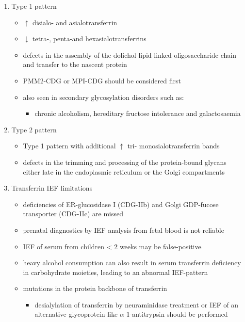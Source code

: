 \documentclass{scrartcl}
\begin{document}
\begin{enumerate}
\item Type 1 pattern
\label{sec:org84e1d1c}
\begin{itemize}
\item \(\uparrow\) disialo- and asialotransferrin
\item \(\downarrow\)  tetra-, penta-and hexasialotransferrins
\item defects in the assembly of the dolichol lipid-linked
oligosaccharide chain and transfer to the nascent protein
\item PMM2-CDG or MPI-CDG should be considered first
\item also seen in secondary glycosylation disorders such as:
\begin{itemize}
\item chronic alcoholism, hereditary fructose intolerance and galactosaemia
\end{itemize}
\end{itemize}

\item Type 2 pattern
\label{sec:org99b9a6f}
\begin{itemize}
\item Type 1 pattern with additional \(\uparrow\) tri- \textpm{}
monosialotransferrin bands
\item defects in the trimming and processing of the protein-bound
glycans either late in the endoplasmic reticulum or the Golgi
compartments
\end{itemize}

\item Transferrin IEF limitations
\label{sec:org056aecc}
\begin{itemize}
\item deficiencies of ER-glucosidase I (CDG-IIb) and Golgi GDP-fucose
transporter (CDG-IIc) are missed
\item prenatal diagnostics by IEF analysis from fetal blood is not
reliable
\item IEF of serum from children \textless{} 2 weeks may be false-positive
\item heavy alcohol consumption can also result in serum transferrin
deficiency in carbohydrate moieties, leading to an abnormal
IEF-pattern
\item mutations in the protein backbone of transferrin
\begin{itemize}
\item desialylation of transferrin by neuraminidase treatment or IEF of
an alternative glycoprotein like \(\alpha\) 1-antitrypsin should be
performed
\end{itemize}
\end{itemize}
\end{enumerate}
\end{document}
